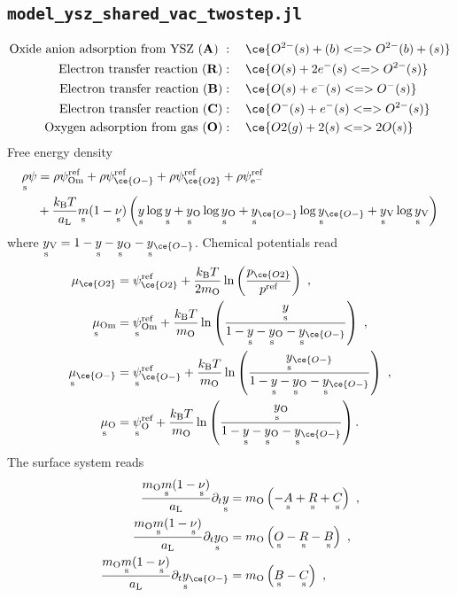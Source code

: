 \documentclass{article}
\numberwithin{equation}{section}
\newcommand{\us}[1]{\underset{\textrm{s}}{#1}{}}
\def\kB{k_\mathrm{B}}
\def\Ox{\mathrm{O}}
\newcommand{\Omin}{{\ce{O-}}}
\def\Om{\mathrm{Om}}
\newcommand{\OO}{{\ce{O2}}}
\def\eM{\mathrm{e^-}}
\def\aL{a_\mathrm{L}}
\def\ys{\us y}
\newcommand{\ysV}{\us y_{\textrm{V}}}
\newcommand{\yOmin}{\us y_{\ce{O-}}}
\def\yOs{{\us y_\textrm{O}}}
\def\REF{\textrm{ref}}
\begin{document}
\subsection{\texttt{model\_ysz\_shared\_vac\_twostep.jl}}
\begin{subequations}
 \begin{align}
\text{Oxide anion adsorption from YSZ (\textbf{A})}  \ &: \quad 
\ce{O^{2-}(s) + (b) <=> O^{2-}(b) + (s)}
\\
\text{Electron transfer reaction (\textbf{R})}   &: \quad 
\ce{O(s) +  2e^-(s) <=> O^{2-}(s)}
\\
\text{Electron transfer reaction (\textbf{B})}   &: \quad 
\ce{O(s) +  e^-(s) <=> O^{-}(s)}
\\
\text{Electron transfer reaction (\textbf{C})}  &: \quad 
\ce{O^-(s) +  e^-(s) <=> O^{2-}(s)}
\\
\text{Oxygen adsorption from gas (\textbf{O})}   &: \quad 
\ce{O2(g) + 2(s) <=> 2O(s)}
\end{align}
\end{subequations}
Free energy density
\begin{align}
    \us\rho\psi &= 
              \rho\psi^\REF_\Om
            + \rho\psi^\REF_\Omin
            + \rho\psi^\REF_\OO
            + \rho\psi^\REF_\eM\nonumber
            \\
            &+ \frac{\kB T}{\aL}\us m(1-\us\nu) 
            \left( 
                \ys   \log {\ys} 
                +\yOs  \log {\yOs}
                +\yOmin  \log {\yOmin}
                +\ysV  \log {\ysV}
            \right)
    \label{}
\end{align}
where $\ysV = 1 - \ys - \yOs - \yOmin$.
Chemical potentials read
\begin{subequations}
\begin{align}
\mu_{\OO} &= \psi_{\OO}^\REF + \frac{\kB T}{2 m_\Ox}\ln 
\left( 
    \frac{p_\OO}{p^\REF} 
\right)~,
\\
\us\mu_{\Om} 
&= 
\us \psi_{\Om}^\REF 
+ 
\frac{\kB T}{m_\Ox} \ln 
\left(  
	\frac{\ys}{1-\ys - \yOs- \yOmin}
\right)~,
\\
\us\mu_{\Omin} 
&= 
\us \psi_{\Omin}^\REF 
+ 
\frac{\kB T}{m_\Ox} \ln 
\left(  
	\frac{\yOmin}{1-\ys - \yOs - \yOmin}
\right)~,
\\
\us\mu_{\Ox} 
&= 
\us \psi_{\Ox}^\REF 
+ 
\frac{\kB T}{m_\Ox} \ln 
\left(  
	\frac{\yOs}{1-\ys - \yOs- \yOmin}
\right).
\end{align}
\end{subequations}
The surface system reads
\begin{subequations}
\begin{align}
 \frac{m_\Ox \us m (1- \us \nu)}{\aL}\partial_t \ys
&=
m_\Ox
\left(
    - \us A
    +\us R
    +\us C
\right)~,
\\
 \frac{m_\Ox \us m (1- \us \nu)}{\aL}\partial_t \yOs
&=
m_\Ox
\left(
      \us O
     -\us R 
     -\us B
\right)~,
\\
\frac{m_\Ox \us m (1- \us \nu)}{\aL}\partial_t \yOmin
&=
m_\Ox 
\left(
    \us B 
   -\us C
\right)~,
\end{align}
\end{subequations}
\end{document}
